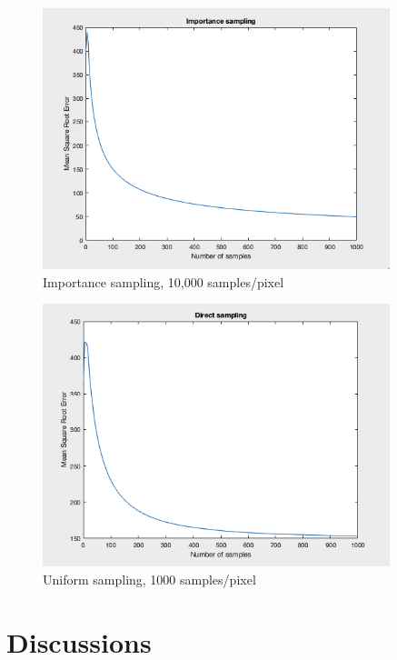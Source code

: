 \documentclass[10pt]{beamer}
\begin{document}
\begin{frame}
	\begin{figure}[H]
  \centering
    \includegraphics[width=0.9\textwidth]{importance_sampling.png}
    \caption{Importance sampling, 10,000 samples/pixel}
\end{figure}
\end{frame}

\begin{frame}
	\begin{figure}[H]
  \centering
    \includegraphics[width=0.9\textwidth]{direct_sampling.png}
    \caption{Uniform sampling, 1000 samples/pixel}
\end{figure}
\end{frame}

\section{Discussions}
\end{document}
